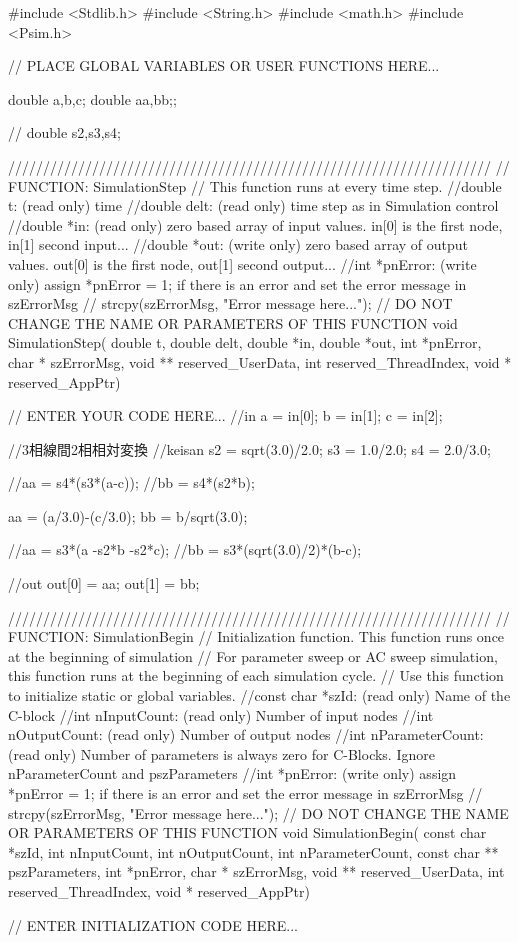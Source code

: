 \begin{mylisting}[language=c,caption=三相線間二相変換,label=hurokuB_3_2]

#include <Stdlib.h>
#include <String.h>
#include <math.h>
#include <Psim.h>

// PLACE GLOBAL VARIABLES OR USER FUNCTIONS HERE...

double a,b,c;
double aa,bb;;

//
double s2,s3,s4;

/////////////////////////////////////////////////////////////////////
// FUNCTION: SimulationStep
//   This function runs at every time step.
//double t: (read only) time
//double delt: (read only) time step as in Simulation control
//double *in: (read only) zero based array of input values. in[0] is the first node, in[1] second input...
//double *out: (write only) zero based array of output values. out[0] is the first node, out[1] second output...
//int *pnError: (write only)  assign  *pnError = 1;  if there is an error and set the error message in szErrorMsg
//    strcpy(szErrorMsg, "Error message here..."); 
// DO NOT CHANGE THE NAME OR PARAMETERS OF THIS FUNCTION
void SimulationStep(
		double t, double delt, double *in, double *out,
		 int *pnError, char * szErrorMsg,
		 void ** reserved_UserData, int reserved_ThreadIndex, void * reserved_AppPtr)
{
// ENTER YOUR CODE HERE...
//in
a = in[0];
b = in[1];
c = in[2];

//3相線間2相相対変換
//keisan
s2 = sqrt(3.0)/2.0;
s3 = 1.0/2.0;
s4 = 2.0/3.0;

//aa = s4*(s3*(a-c));
//bb = s4*(s2*b);

aa = (a/3.0)-(c/3.0);
bb = b/sqrt(3.0);


//aa = s3*(a -s2*b -s2*c);
//bb = s3*(sqrt(3.0)/2)*(b-c);


//out
out[0] = aa;
out[1] = bb;



}


/////////////////////////////////////////////////////////////////////
// FUNCTION: SimulationBegin
//   Initialization function. This function runs once at the beginning of simulation
//   For parameter sweep or AC sweep simulation, this function runs at the beginning of each simulation cycle.
//   Use this function to initialize static or global variables.
//const char *szId: (read only) Name of the C-block 
//int nInputCount: (read only) Number of input nodes
//int nOutputCount: (read only) Number of output nodes
//int nParameterCount: (read only) Number of parameters is always zero for C-Blocks.  Ignore nParameterCount and pszParameters
//int *pnError: (write only)  assign  *pnError = 1;  if there is an error and set the error message in szErrorMsg
//    strcpy(szErrorMsg, "Error message here..."); 
// DO NOT CHANGE THE NAME OR PARAMETERS OF THIS FUNCTION
void SimulationBegin(
		const char *szId, int nInputCount, int nOutputCount,
		 int nParameterCount, const char ** pszParameters,
		 int *pnError, char * szErrorMsg,
		 void ** reserved_UserData, int reserved_ThreadIndex, void * reserved_AppPtr)
{
// ENTER INITIALIZATION CODE HERE...




}
\end{mylisting}
